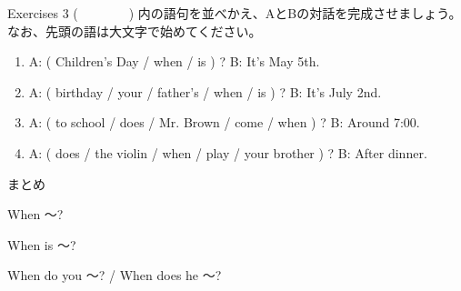 \documentclass[aspectratio=169,xcolor={dvipsnames,table}]{beamer}
\begin{document}
\begin{frame}[plain]{Exercises 3}
 (~~~~~~~~) 内の語句を並べかえ、AとBの対話を完成させましょう。なお、先頭の語は大文字で始めてください。

\begin{enumerate}
 \item A: ( Children's Day / when / is ) ? 
\hspace{137.4pt}B: It's May 5th.\\
\phantom{A: }
 \item A: ( birthday / your / father's / when / is ) ?
\hspace{83.5pt}B: It's July 2nd.\\
\phantom{A: }
 \item A: ( to school / does / Mr. Brown / come / when ) ?
\hspace{47pt}B: Around 7:00.\\
\phantom{A: }
 \item A: ( does / the violin / when / play / your brother ) ?
\hspace{39.7pt}B: After dinner.\\
\phantom{A: }
\end{enumerate}

\mbox{}\hfill{}

\end{frame}
\begin{frame}[plain]{まとめ}
 \begin{block}{When ～?}
\begin{description}[　　　　]
 \item[be動詞] When is ～?
 \item[一般動詞] When do you ～? / When does he ～?
\end{description}
  
 \end{block}
\end{frame}
\end{document}
